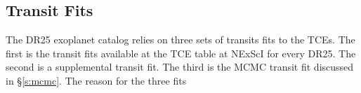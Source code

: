 \subsection{Transit Fits}
The DR25 exoplanet catalog relies on three sets of transits fits to the TCEs. The first is the transit fits available at the TCE table at NExScI for every DR25. The second is a supplemental transit fit. The third is the MCMC transit fit discussed in \S\ref{s:mcmc}.  The reason for the three fits 